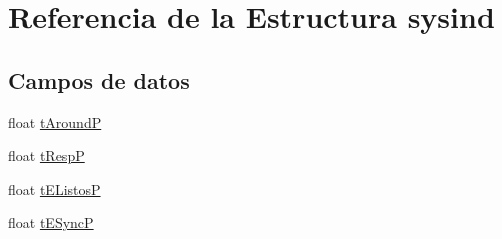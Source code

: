 \hypertarget{structsysind}{\section{Referencia de la Estructura sysind}
\label{structsysind}
}
\subsection*{Campos de datos}
\begin{DoxyCompactItemize}
\item 
float \hyperlink{structsysind_a06eba9823dc8177cb687b7337869aaef}{t\-Around\-P}
\item 
float \hyperlink{structsysind_a86e05f4616e5e694050acf216b13c754}{t\-Resp\-P}
\item 
float \hyperlink{structsysind_afd4637d57dff2e166ea431b016f75b5a}{t\-E\-Listos\-P}
\item 
float \hyperlink{structsysind_aaec14f627654b7bd5f8d108338536a4c}{t\-E\-Sync\-P}
\end{DoxyCompactItemize}


